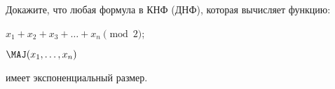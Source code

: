 Докажите, что любая формула в КНФ (ДНФ), которая вычисляет функцию:
\begin{enumcyr}
    \item $x_1 + x_2 + x_3 + \dots + x_n  \pmod 2$;
    \item $\MAJ(x_1, \dots, x_n)$
\end{enumcyr}
имеет экспоненциальный размер.